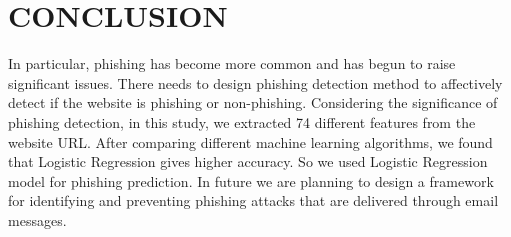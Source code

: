 \chapter{CONCLUSION}
\thispagestyle{empty}
\par In particular, phishing has become more common and
has begun to raise significant issues. There needs to design phishing 
 detection method to affectively detect if the website is phishing or non-phishing. Considering the significance of phishing detection,
in this study, we extracted 74 different features from the website URL. After comparing different machine learning algorithms, we found that Logistic Regression gives higher accuracy. So we used Logistic Regression model for phishing prediction. In future we are planning to design a
framework for identifying and preventing phishing attacks that are delivered through email messages.
